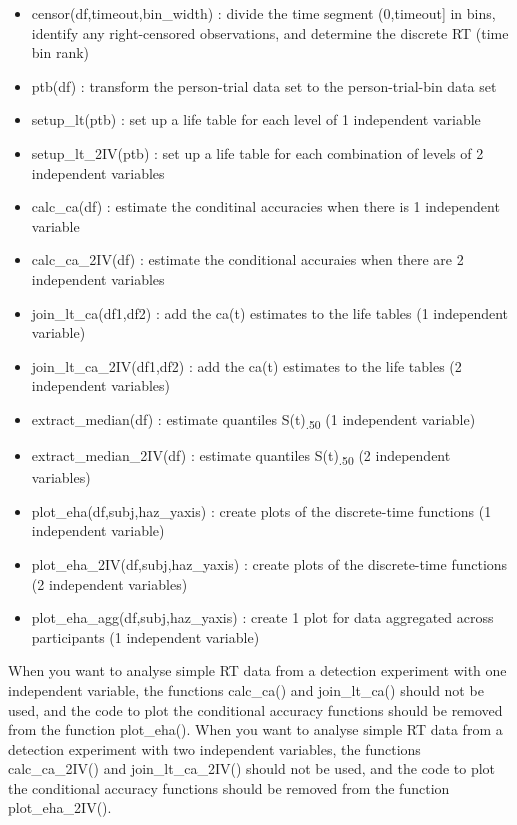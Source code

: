 \documentclass[
  man, donotrepeattitle,floatsintext]{apa6}
\providecommand{\tightlist}{%
  \setlength{\itemsep}{0pt}\setlength{\parskip}{0pt}}
\begin{document}
\begin{itemize}
\tightlist
\item
  censor(df,timeout,bin\_width) : divide the time segment (0,timeout{]} in bins, identify any right-censored observations, and determine the discrete RT (time bin rank)
\item
  ptb(df) : transform the person-trial data set to the person-trial-bin data set
\item
  setup\_lt(ptb) : set up a life table for each level of 1 independent variable
\item
  setup\_lt\_2IV(ptb) : set up a life table for each combination of levels of 2 independent variables
\item
  calc\_ca(df) : estimate the conditinal accuracies when there is 1 independent variable
\item
  calc\_ca\_2IV(df) : estimate the conditional accuraies when there are 2 independent variables
\item
  join\_lt\_ca(df1,df2) : add the ca(t) estimates to the life tables (1 independent variable)
\item
  join\_lt\_ca\_2IV(df1,df2) : add the ca(t) estimates to the life tables (2 independent variables)
\item
  extract\_median(df) : estimate quantiles S(t)\textsubscript{.50} (1 independent variable)
\item
  extract\_median\_2IV(df) : estimate quantiles S(t)\textsubscript{.50} (2 independent variables)
\item
  plot\_eha(df,subj,haz\_yaxis) : create plots of the discrete-time functions (1 independent variable)
\item
  plot\_eha\_2IV(df,subj,haz\_yaxis) : create plots of the discrete-time functions (2 independent variables)
\item
  plot\_eha\_agg(df,subj,haz\_yaxis) : create 1 plot for data aggregated across participants (1 independent variable)
\end{itemize}

When you want to analyse simple RT data from a detection experiment with one independent variable, the functions calc\_ca() and join\_lt\_ca() should not be used, and the code to plot the conditional accuracy functions should be removed from the function plot\_eha().
When you want to analyse simple RT data from a detection experiment with two independent variables, the functions calc\_ca\_2IV() and join\_lt\_ca\_2IV() should not be used, and the code to plot the conditional accuracy functions should be removed from the function plot\_eha\_2IV().
\end{document}
